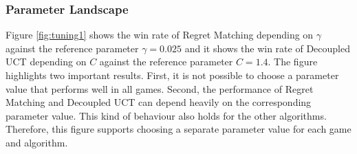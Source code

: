 \documentclass[conference]{IEEEtran}
\begin{document}
\subsubsection{Parameter Landscape}
Figure \ref{fig:tuning1} shows the win rate of Regret Matching depending on $\gamma$ against the reference parameter $\gamma = 0.025$ and it shows the win rate of Decoupled UCT depending on $C$ against the reference parameter $C=1.4$. The figure highlights two important results. First, it is not possible to choose a parameter value that performs well in all games. Second, the performance of Regret Matching and Decoupled UCT can depend heavily on the corresponding parameter value. This kind of behaviour also holds for the other algorithms. Therefore, this figure supports choosing a separate parameter value for each game and algorithm.
\end{document}
